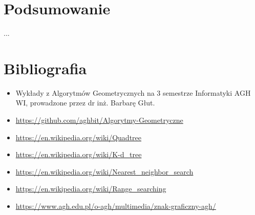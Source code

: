\documentclass{lab}
\begin{document}
\section{Podsumowanie}
...

\newpage
\section{Bibliografia}
\begin{itemize}
  \item Wykłady z Algorytmów Geometrycznych na 3 semestrze Informatyki AGH WI, prowadzone przez dr inż. Barbarę Głut.
  \item \url{https://github.com/aghbit/Algorytmy-Geometryczne}
  \item \url{https://en.wikipedia.org/wiki/Quadtree}
  \item \url{https://en.wikipedia.org/wiki/K-d_tree}
  \item \url{https://en.wikipedia.org/wiki/Nearest_neighbor_search}
  \item \url{https://en.wikipedia.org/wiki/Range_searching}
  \item \url{https://www.agh.edu.pl/o-agh/multimedia/znak-graficzny-agh/}
\end{itemize}
\end{document}
